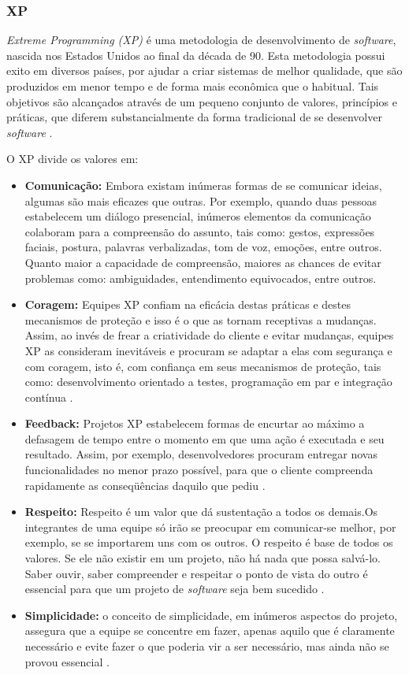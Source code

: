 \documentclass{acm_proc_article-sp}
\begin{document}
\subsubsection{XP}
\textit{Extreme Programming (XP)} é uma metodologia de desenvolvimento de \textit{software}, nascida nos Estados Unidos ao final da década de 90. Esta metodologia possui exito em diversos países, por ajudar a criar sistemas de melhor qualidade, que são produzidos em menor tempo e de forma mais econômica que o habitual. Tais objetivos são alcançados através de um pequeno conjunto de valores, princípios e práticas, que diferem substancialmente da forma tradicional de se desenvolver \textit{software} \cite{xp:agil}.

O XP divide os valores em:

\begin{itemize}
\item \textbf{Comunicação:} Embora existam inúmeras formas de se comunicar ideias, algumas são mais eficazes que outras. Por exemplo, quando duas pessoas estabelecem um diálogo presencial, inúmeros elementos da comunicação colaboram para a compreensão do assunto, tais como: gestos, expressões faciais, postura, palavras verbalizadas, tom de voz, emoções, entre outros. Quanto maior a capacidade de compreensão, maiores as chances de evitar problemas como: ambiguidades, entendimento equivocados, entre outros\cite{xp:agil}.
\item \textbf{Coragem:} Equipes XP confiam na eficácia destas práticas e destes mecanismos de proteção e isso é o que as tornam receptivas a mudanças. Assim, ao invés de frear a criatividade do cliente e evitar mudanças, equipes XP as consideram inevitáveis e procuram se adaptar a elas com segurança e com coragem, isto é, com confiança em seus mecanismos de proteção, tais como: desenvolvimento orientado a testes, programação em par e integração contínua \cite{xp:agil}.
\item \textbf{Feedback:} Projetos XP estabelecem formas de encurtar ao máximo a defasagem de tempo entre o momento em que uma ação é executada e seu resultado. Assim, por exemplo, desenvolvedores procuram entregar novas funcionalidades no menor prazo possível, para que o cliente compreenda rapidamente as conseqüências daquilo que pediu \cite{xp:agil}.
\item \textbf{Respeito:} Respeito é um valor que dá sustentação a todos os demais.Os integrantes de uma equipe só irão se preocupar em comunicar-se melhor, por exemplo, se se importarem uns com os outros. O respeito é base de todos os valores. Se ele não existir em um projeto, não há nada que possa salvá-lo. Saber ouvir, saber compreender e respeitar o ponto de vista do outro é essencial para que um projeto de \textit{software} seja bem sucedido \cite{xp:agil}.
\item \textbf{Simplicidade:} o conceito de simplicidade, em inúmeros aspectos do projeto, assegura que a equipe se concentre em fazer, apenas aquilo que é claramente necessário e evite fazer o que poderia vir a ser necessário, mas ainda não se provou essencial \cite{xp:agil}.
\end{itemize}
\end{document}
